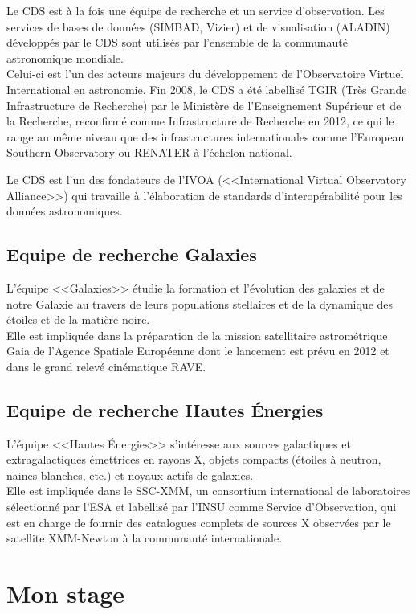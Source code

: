 \documentclass[a4paper,french,12pt]{article}
\begin{document}
		Le CDS est à la fois une équipe de recherche et un service d’observation.
		Les services de bases de données (SIMBAD, Vizier) et de visualisation (ALADIN) développés par le CDS
		sont utilisés par l’ensemble de la communauté astronomique mondiale. \\
		Celui-ci est l'un des acteurs majeurs du développement de l'Observatoire Virtuel International en astronomie.
		Fin 2008, le CDS a été labellisé TGIR (Très Grande Infrastructure de Recherche) par le Ministère de l'Enseignement Supérieur et de la Recherche, 
		reconfirmé comme Infrastructure de Recherche en 2012, ce qui le range au même niveau que des infrastructures internationales
		comme l’European Southern Observatory ou RENATER à l’échelon national.
		
		Le CDS est l'un des fondateurs de l'IVOA (<<International Virtual Observatory Alliance>>) qui travaille à
		l'élaboration de standards d'interopérabilité pour les données astronomiques.

	\subsection{Equipe de recherche Galaxies}
	
		L’équipe <<Galaxies>> étudie la formation et l’évolution des galaxies et de notre Galaxie 
		au travers de leurs populations stellaires et de la dynamique des étoiles et de la matière noire. \\
		Elle est impliquée dans la préparation de la mission satellitaire astrométrique Gaia de l’Agence Spatiale Européenne 
		dont le lancement est prévu en 2012 et dans le grand relevé cinématique RAVE. 
	
	\subsection{Equipe de recherche Hautes Énergies} 
	
		L’équipe <<Hautes Énergies>> s’intéresse aux sources galactiques et extragalactiques émettrices en rayons X,
		objets compacts (étoiles à neutron, naines blanches, etc.) et noyaux actifs de galaxies.\\
		Elle est impliquée dans le SSC-XMM, un consortium international de laboratoires sélectionné par l’ESA
		et labellisé par l’INSU comme Service d’Observation, qui est en charge de fournir des catalogues complets
		de sources X observées par le satellite XMM-Newton à la communauté internationale. 

\section{Mon stage}
\end{document}
